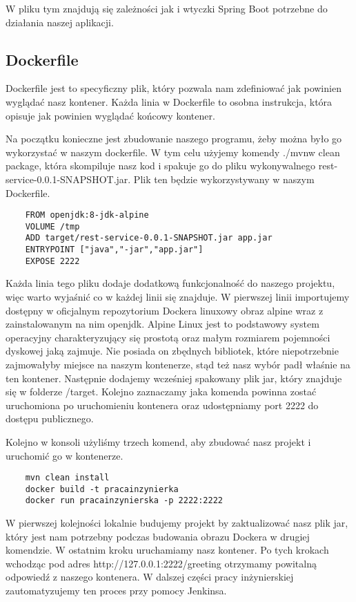W pliku tym znajdują się zależności jak i wtyczki Spring Boot potrzebne do działania naszej aplikacji. 

\subsection{Dockerfile} 

Dockerfile jest to specyficzny plik, który pozwala nam zdefiniować jak powinien wyglądać nasz kontener. Każda linia w Dockerfile to osobna instrukcja, która opisuje jak powinien wyglądać końcowy kontener. 

Na początku konieczne jest zbudowanie naszego programu, żeby można było go wykorzystać w naszym dockerfile. W tym celu użyjemy komendy ./mvnw clean package, która skompiluje nasz kod i spakuje go do pliku wykonywalnego rest-service-0.0.1-SNAPSHOT.jar. Plik ten będzie wykorzystywany w naszym Dockerfile. 

\begin{lstlisting}
    FROM openjdk:8-jdk-alpine
    VOLUME /tmp
    ADD target/rest-service-0.0.1-SNAPSHOT.jar app.jar
    ENTRYPOINT ["java","-jar","app.jar"]
    EXPOSE 2222
\end{lstlisting}


Każda linia tego pliku dodaje dodatkową funkcjonalność do naszego projektu, więc warto wyjaśnić co w każdej linii się znajduje. W pierwszej linii importujemy dostępny w oficjalnym repozytorium Dockera linuxowy obraz alpine wraz z zainstalowanym na nim openjdk. Alpine Linux jest to podstawowy system operacyjny charakteryzujący się prostotą oraz małym rozmiarem pojemności dyskowej jaką zajmuje. Nie posiada on zbędnych bibliotek, które niepotrzebnie zajmowałyby miejsce na naszym kontenerze, stąd też nasz wybór padł właśnie na ten kontener. Następnie dodajemy wcześniej spakowany plik jar, który znajduje się w folderze /target. Kolejno zaznaczamy jaka komenda powinna zostać uruchomiona po uruchomieniu kontenera oraz udostępniamy port 2222 do dostępu publicznego. 

Kolejno w konsoli użyliśmy trzech komend, aby zbudować nasz projekt i uruchomić go w kontenerze. 
\begin{lstlisting}
    mvn clean install 
    docker build -t pracainzynierka
    docker run pracainzynierska -p 2222:2222
\end{lstlisting}
W pierwszej kolejności lokalnie budujemy projekt by zaktualizować nasz plik jar, który jest nam potrzebny podczas budowania obrazu Dockera w drugiej komendzie. W ostatnim kroku uruchamiamy nasz kontener. Po tych krokach wchodząc pod adres http://127.0.0.1:2222/greeting otrzymamy powitalną odpowiedź z naszego kontenera. 
W dalszej części pracy inżynierskiej zautomatyzujemy ten proces przy pomocy Jenkinsa. 

